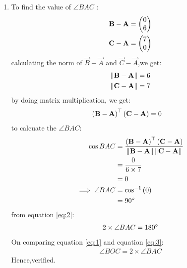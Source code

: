 \documentclass[11pt]{book}
\begin{document}
\begin{enumerate}[label=\thesection.\arabic*.,ref=\thesection.\theenumi]
\begin{enumerate}
	\item To find  the value of $\angle{BAC}$ :
\begin{align}
\mathbf{B}-\mathbf{A} &= \begin{pmatrix}0\\6\end{pmatrix}\\
\mathbf{C}-\mathbf{A} &= \begin{pmatrix}7\\0\end{pmatrix}
\end{align}
calculating the norm of $\vec{B}-\vec{A}$ and $\vec{C}-\vec{A}$,we get:
\begin{align}
	\left\lVert\mathbf{B}-\mathbf{A}\right\rVert &= 6\\
	\left\lVert\mathbf{C}-\mathbf{A}\right\rVert &= 7
\end{align}
by doing matrix multiplication, we get:
\begin{align}
\left(\mathbf{B}-\mathbf{A}\right)^{\top}\left(\mathbf{C}-\mathbf{A}\right) &= 0
\end{align}
to calcuate the $\angle{BAC}$:
\begin{align}
\cos{BAC} &= \frac{\brak{\vec{B}-\vec{A}}^{\top}\brak{\vec{C}-\vec{A}}}{\norm{\vec{B}-\vec{A}}\norm{\vec{C}-\vec{A}}}\\
&= \frac{0}{6\times7}\\
&= 0\\
	\implies\angle{BAC} &= \cos^{-1}\brak{0}\\
&= 90\degree \label{eq:2}
\end{align}
from equation \eqref{eq:2}: 
\begin{align}
2\times\angle{BAC} = 180\degree \label{eq:3}
\end{align}
On comparing equation \eqref{eq:1} and equation \eqref{eq:3}:
\begin{align}
\angle{BOC} = 2\times\angle{BAC}
\end{align}
Hence,verified.
\end{enumerate}


\end{enumerate}
\end{document}
